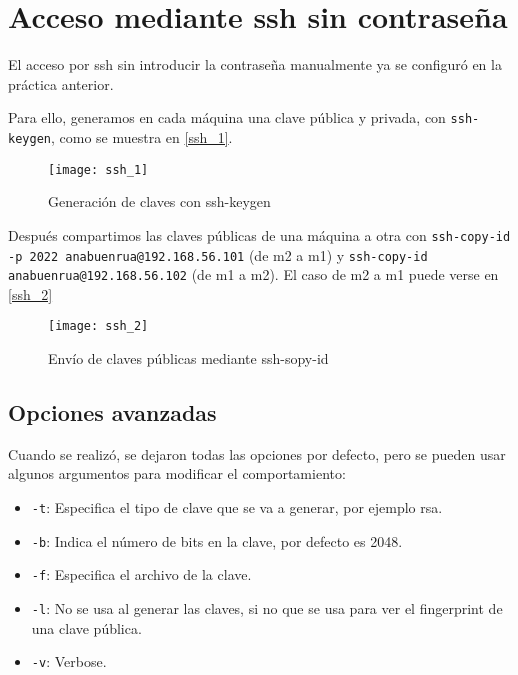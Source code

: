 \chapter{Acceso mediante ssh sin contraseña}

El acceso por ssh sin introducir la contraseña manualmente ya se configuró en la práctica anterior.

Para ello, generamos en cada máquina una clave pública y privada, con \verb|ssh-keygen|, como se muestra en \eqref{ssh_1}.

\begin{figure}[h!]
\begin{center}
\caption{Generación de claves con ssh-keygen}
\label{ssh_1}
\texttt{[image: ssh\_1]}
\end{center}
\end{figure}

Después compartimos las claves públicas de una máquina a otra con \verb|ssh-copy-id -p 2022 anabuenrua@192.168.56.101| (de m2 a m1) y \verb|ssh-copy-id anabuenrua@192.168.56.102| (de m1 a m2). El caso de m2 a m1 puede verse en \eqref{ssh_2}

\begin{figure}[h!]
\begin{center}
\caption{Envío de claves públicas mediante ssh-sopy-id}
\label{ssh_2}
\texttt{[image: ssh\_2]}
\end{center}
\end{figure}

\section{Opciones avanzadas}

Cuando se realizó, se dejaron todas las opciones por defecto, pero se pueden usar algunos argumentos para modificar el comportamiento:

\begin{itemize}
\item \verb|-t|: Especifica el tipo de clave que se va a generar, por ejemplo rsa.
\item \verb|-b|: Indica el número de bits en la clave, por defecto es 2048.
\item \verb|-f|: Especifica el archivo de la clave.
\item \verb|-l|: No se usa al generar las claves, si no que se usa para ver el fingerprint de una clave pública.
\item \verb|-v|: Verbose.
\end{itemize}

